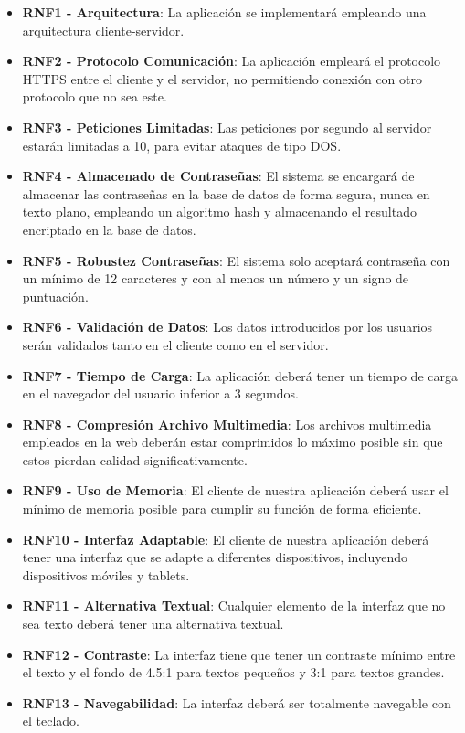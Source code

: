 \begin{itemize}
	\item \textbf{RNF1 - Arquitectura}: La aplicación se implementará empleando una arquitectura cliente-servidor.
	\item \textbf{RNF2 - Protocolo Comunicación}: La aplicación empleará el protocolo HTTPS entre el cliente y el servidor, no permitiendo conexión con otro protocolo que no sea este.
	\item \textbf{RNF3 - Peticiones Limitadas}: Las peticiones por segundo al servidor estarán limitadas a 10, para evitar ataques de tipo DOS.
	\item \textbf{RNF4 - Almacenado de Contraseñas}: El sistema se encargará de almacenar las contraseñas en la base de datos de forma segura, nunca en texto plano, empleando un algoritmo hash y almacenando el resultado encriptado en la base de datos.
	\item \textbf{RNF5 - Robustez Contraseñas}: El sistema solo aceptará contraseña con un mínimo de 12 caracteres y con al menos un número y un signo de puntuación.
	\item \textbf{RNF6 - Validación de Datos}: Los datos introducidos por los usuarios serán validados tanto en el cliente como en el servidor. 
	\item \textbf{RNF7 - Tiempo de Carga}: La aplicación deberá tener un tiempo de carga en el navegador del usuario inferior a 3 segundos.
	\item \textbf{RNF8 - Compresión Archivo Multimedia}: Los archivos multimedia empleados en la web deberán estar comprimidos lo máximo posible sin que estos pierdan calidad significativamente.
	\item \textbf{RNF9 - Uso de Memoria}: El cliente de nuestra aplicación deberá usar el mínimo de memoria posible para cumplir su función de forma eficiente.
	\item \textbf{RNF10 - Interfaz Adaptable}: El cliente de nuestra aplicación deberá tener una interfaz que se adapte a diferentes dispositivos, incluyendo dispositivos móviles y tablets.
	\item \textbf{RNF11 - Alternativa Textual}: Cualquier elemento de la interfaz que no sea texto deberá tener una alternativa textual.
	\item \textbf{RNF12 - Contraste}: La interfaz tiene que tener un contraste mínimo entre el texto y el fondo de 4.5:1 para textos pequeños y 3:1 para textos grandes.
	\item \textbf{RNF13 - Navegabilidad}: La interfaz deberá ser totalmente navegable con el teclado.

\end{itemize}
